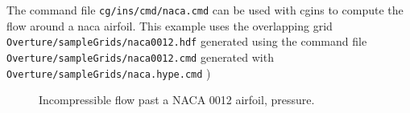 \documentclass{article}
\newcommand{\Index}[1]{#1\index{#1}}
\newcommand{\obFigures}{\homeHenshaw/res/OverBlown/docFigures}  %
\begin{document}
The command file {\tt cg/ins/cmd/naca.cmd} can be used with cgins to compute the
flow around a naca airfoil.
This example uses the overlapping grid {\tt Overture/\-sampleGrids/\-naca0012.hdf}  generated
using the command file {\tt Overture/\-sampleGrids/\-naca0012.cmd} 
generated with {\tt Overture/\-sampleGrids/\-naca.hype.cmd} )

{
\begin{figure}[hbt]
\newcommand{\figWidtha}{9.5cm}
\newcommand{\trimfiga}[2]{\trimPlot{#1}{#2}{.118}{.13}{.24}{.22}}
\begin{center}
\end{center} 
\caption{Incompressible flow past a NACA 0012 airfoil, pressure.}
\label{fig:naca}
\end{figure}
}



\end{document}
